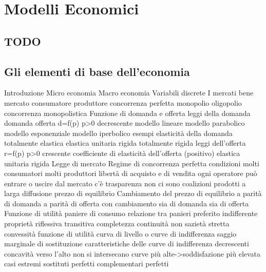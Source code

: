 
\chapter{Modelli Economici}

\section{TODO}

\section{Gli elementi di base dell'economia}
\label{sec:modec_elementi_di_base}

Introduzione
  Micro economia
  Macro economia
  Variabili discrete
I mercati
  bene
  mercato
  consumatore
  produttore
  concorrenza perfetta
  monopolio
  oligopolio
  concorrenza monopolistica
Funzione di domanda e offerta
  leggi della domanda
    domanda
    offerta
    d=f(p) p>0 decrescente
      modello lineare
      modello parabolico
      modello esponenziale
      modello iperbolico
    esempi
    elasticità della domanda
      totalmente elastica
      elastica
      unitaria
      rigida
      totalmente rigida
  leggi dell'offerta
    r=f(p) p>0 crescente
    coefficiente di elasticità dell'offerta (positivo)
      elastica
      unitaria
      rigida
Legge di mercato
  Regime di concorrenza perfetta
    condizioni
      molti consumatori
      molti produttori
      libertà di acquisto e di vendita
      ogni operatore può entrare o uscire dal mercato 
      c'è trasparenza
      non ci sono coalizioni
      prodotti a larga diffusione
    prezzo di equilibrio
  Cambiamento del prezzo di equilibrio
    a parità di domanda
    a parità di offerta
    con cambiamento sia di domanda sia di offerta
Funzione di utilità
  paniere di consumo
    relazione tra panieri
      preferito
      indifferente
    proprietà
      riflessiva
      transitiva
      completezza
      continuità
      non sazietà
      stretta convessità
    funzione di utilità
      curva di livello o curve di indifferenza
      saggio marginale di sostituzione
        caratteristiche delle curve di indifferenza
          decrescenti
          concavità verso l'alto
          non si intersecano
          curve più alte->soddisfazione più elevata
        casi estremi
          sostituti perfetti
          complementari perfetti

